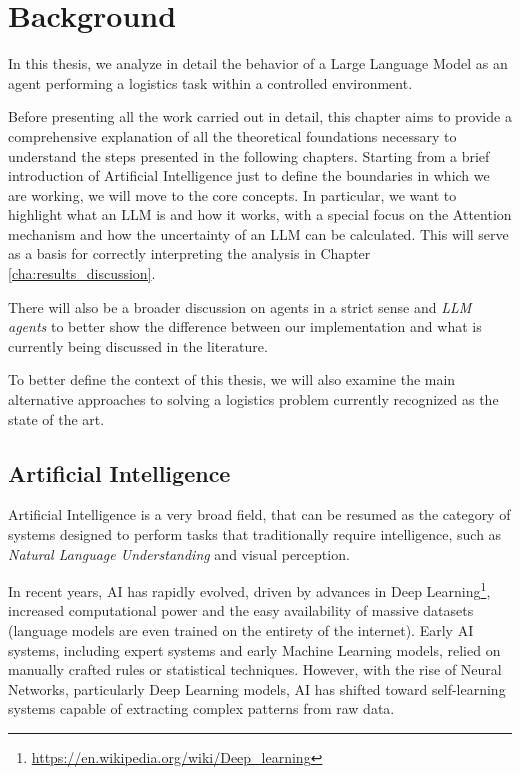 \chapter{Background}
\label{cha:background}

In this thesis, we analyze in detail the behavior of a Large Language Model as an
agent performing a logistics task within a controlled environment.

Before presenting all the work carried out in detail, this chapter aims to
provide a comprehensive explanation of all the theoretical foundations necessary
to understand the steps presented in the following chapters. Starting from a brief
introduction of Artificial Intelligence just to define the boundaries in which we
are working, we will move to the core concepts. In particular, we want to
highlight what an LLM is and how it works, with a special focus on the Attention
mechanism and how the uncertainty of an LLM can be calculated. This will serve
as a basis for correctly interpreting the analysis in Chapter
\ref{cha:results_discussion}.

There will also be a broader discussion on agents in a strict sense and \emph{LLM
agents} to better show the difference between our implementation and what is currently
being discussed in the literature.

To better define the context of this thesis, we will also examine the main
alternative approaches to solving a logistics problem currently recognized as
the state of the art.

\section{Artificial Intelligence}
\label{sec:artificial_intelligence}

Artificial Intelligence is a very broad field, that can be resumed as the
category of systems designed to perform tasks that traditionally require
intelligence, such as \emph{Natural Language Understanding} and visual
perception.

In recent years, AI has rapidly evolved, driven by advances in Deep Learning\footnote{\url{https://en.wikipedia.org/wiki/Deep_learning}},
increased computational power and the easy availability of massive datasets (language
models are even trained on the entirety of the internet). Early AI systems,
including expert systems and early Machine Learning models, relied on manually crafted
rules or statistical techniques. However, with the rise of Neural Networks,
particularly Deep Learning models, AI has shifted toward self-learning systems capable
of extracting complex patterns from raw data.

